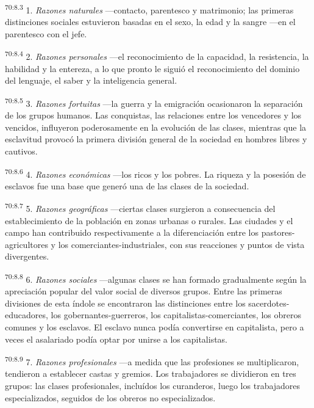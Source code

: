 \documentclass[twoside, 11pt]{book}
\begin{document}
\par
\textsuperscript{70:8.3} 1. \textit{Razones naturales} ---contacto, parentesco y matrimonio; las primeras distinciones sociales estuvieron basadas en el sexo, la edad y la sangre ---en el parentesco con el jefe.

\par
\textsuperscript{70:8.4} 2. \textit{Razones personales} ---el reconocimiento de la capacidad, la resistencia, la habilidad y la entereza, a lo que pronto le siguió el reconocimiento del dominio del lenguaje, el saber y la inteligencia general.

\par
\textsuperscript{70:8.5} 3. \textit{Razones fortuitas} ---la guerra y la emigración ocasionaron la separación de los grupos humanos. Las conquistas, las relaciones entre los vencedores y los vencidos, influyeron poderosamente en la evolución de las clases, mientras que la esclavitud provocó la primera división general de la sociedad en hombres libres y cautivos.

\par
\textsuperscript{70:8.6} 4. \textit{Razones económicas} ---los ricos y los pobres. La riqueza y la posesión de esclavos fue una base que generó una de las clases de la sociedad.

\par
\textsuperscript{70:8.7} 5. \textit{Razones geográficas} ---ciertas clases surgieron a consecuencia del establecimiento de la población en zonas urbanas o rurales. Las ciudades y el campo han contribuido respectivamente a la diferenciación entre los pastores-agricultores y los comerciantes-industriales, con sus reacciones y puntos de vista divergentes.

\par
\textsuperscript{70:8.8} 6. \textit{Razones sociales} ---algunas clases se han formado gradualmente según la apreciación popular del valor social de diversos grupos. Entre las primeras divisiones de esta índole se encontraron las distinciones entre los sacerdotes-educadores, los gobernantes-guerreros, los capitalistas-comerciantes, los obreros comunes y los esclavos. El esclavo nunca podía convertirse en capitalista, pero a veces el asalariado podía optar por unirse a los capitalistas.

\par
\textsuperscript{70:8.9} 7. \textit{Razones profesionales} ---a medida que las profesiones se multiplicaron, tendieron a establecer castas y gremios. Los trabajadores se dividieron en tres grupos: las clases profesionales, incluídos los curanderos, luego los trabajadores especializados, seguidos de los obreros no especializados.
\end{document}
